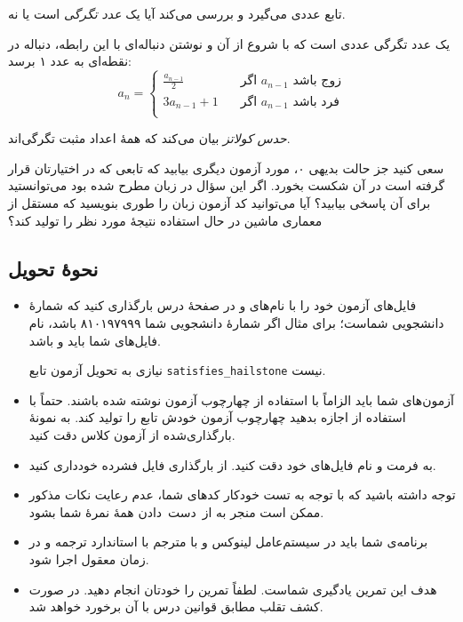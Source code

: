 \documentclass{utap}
\begin{document}
    تابع  عددی می‌گیرد و بررسی می‌کند آیا یک \textit{عدد تگرگی}\cite{su} است یا نه.

    یک عدد تگرگی عددی است که با شروع از آن و نوشتن دنباله‌ای با این رابطه، دنباله در نقطه‌ای به عدد ۱ برسد:
    \[ a_n =
      \begin{cases}
        \frac{a_{n - 1}}{2} & \quad \text{اگر $a_{n - 1}$ زوج باشد}\\
        3a_{n - 1} + 1 & \quad \text{اگر $a_{n - 1}$ فرد باشد}\\
      \end{cases}
    \]

    \textit{حدس کولاتز} بیان می‌کند که همهٔ اعداد مثبت تگرگی‌اند.

    سعی کنید جز حالت بدیهی ۰، مورد آزمون دیگری بیابید که تابعی که در اختیارتان قرار گرفته است در آن شکست بخورد.
    اگر این سؤال در زبان  مطرح شده بود می‌توانستید برای آن پاسخی بیابید؟
    آیا می‌توانید کد آزمون زبان  را طوری بنویسید که مستقل از معماری ماشین در حال استفاده نتیجهٔ مورد نظر را تولید کند؟

    \subsection{نحوهٔ تحویل}

    \begin{itemize}
    \item فایل‌های آزمون خود را با نام‌های  و  در صفحهٔ  درس بارگذاری کنید که  شمارهٔ دانشجویی شماست؛ برای مثال اگر شمارهٔ دانشجویی شما ۸۱۰۱۹۷۹۹۹ باشد، نام فایل‌های شما باید  و  باشد.

    نیازی به تحویل آزمون تابع \lstinline{satisfies_hailstone} نیست.

    \item آزمون‌های شما باید الزاماً با استفاده از چهارچوب آزمون  نوشته شده باشند.
    حتماً با استفاده از  اجازه بدهید چهارچوب آزمون خودش تابع  را تولید کند.
    به نمونهٔ بارگذاری‌شده از آزمون کلاس  دقت کنید.
    
    \item به فرمت و نام فایل‌های خود دقت کنید. از بارگذاری فایل فشرده خودداری کنید.

    \item توجه داشته باشید که با توجه به تست خودکار کدهای شما، عدم رعایت نکات مذکور ممکن است منجر به از~دست~دادن همهٔ نمرهٔ شما بشود.
    
    \item برنامه‌ی شما باید در سیستم‌عامل لینوکس و با مترجم  با استاندارد  ترجمه و در زمان معقول اجرا شود.
    
    \item هدف این تمرین یادگیری شماست. لطفاً تمرین را خودتان انجام دهید. در صورت کشف تقلب مطابق قوانین درس با آن برخورد خواهد شد.
    \end{itemize}
\end{document}
